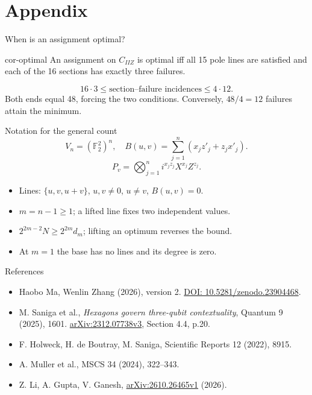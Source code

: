 \documentclass{beamer}
\begin{document}
\section{Appendix}
\begin{frame}{When is an assignment optimal?}
\begin{bookresult}{cor-optimal}
An assignment on $C_{IIZ}$ is optimal iff all 15 pole lines are satisfied and each of the 16 sections has exactly three failures.
\end{bookresult}
\[16\cdot3\le\text{section--failure incidences}\le4\cdot12.\]
Both ends equal 48, forcing the two conditions.
Conversely, $48/4=12$ failures attain the minimum.
\end{frame}
\begin{frame}{Notation for the general count}
\[
V_n=(\mathbb F_2^2)^n,\quad B(u,v)=\sum_{j=1}^{n}(x_jz'_j+z_jx'_j).
\]
\[P_v=\bigotimes_{j=1}^{n}i^{x_jz_j}X^{x_j}Z^{z_j}.\]
\begin{itemize}
\item Lines: $\{u,v,u+v\}$, $u,v\ne0$, $u\ne v$, $B(u,v)=0$.
\item $m=n-1\ge1$; a lifted line fixes two independent values.
\item $2^{2m-2}N\ge2^{2m}d_m$; lifting an optimum reverses the bound.
\item At $m=1$ the base has no lines and its degree is zero.
\end{itemize}
\end{frame}
\begin{frame}{References}
\small
\begin{itemize}
\item Haobo Ma, Wenlin Zhang (2026), version 2.\newline
\href{https://doi.org/10.5281/zenodo.23904468}{DOI: 10.5281/zenodo.23904468}.
\item M. Saniga et al., \emph{Hexagons govern three-qubit contextuality}, Quantum 9 (2025), 1601.\newline
\href{https://arxiv.org/abs/2312.07738v3}{arXiv:2312.07738v3}, Section 4.4, p.20.
\item F. Holweck, H. de Boutray, M. Saniga, Scientific Reports 12 (2022), 8915.
\item A. Muller et al., MSCS 34 (2024), 322--343.
\item Z. Li, A. Gupta, V. Ganesh, \href{https://arxiv.org/abs/2610.26465v1}{arXiv:2610.26465v1} (2026).
\end{itemize}
\end{frame}
\FormalVerification
\end{document}
